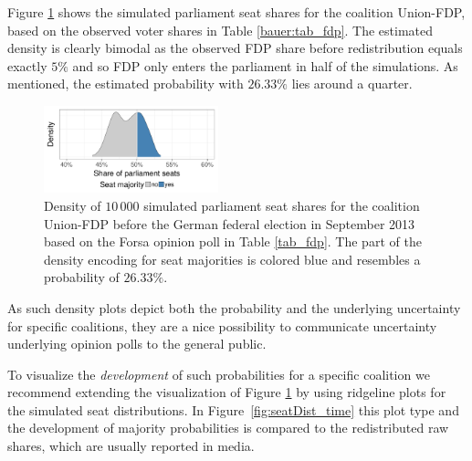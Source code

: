 \documentclass[smallcondensed]{svjour3}     %
\begin{document}
Figure \ref{fig:seatDist} shows the simulated
parliament seat shares for the coalition Union-FDP, based on the observed
voter shares in Table \ref{bauer:tab_fdp}. The estimated density is clearly bimodal
as the observed FDP share before redistribution equals exactly $5\%$ and
so FDP only enters the parliament in half of the simulations. As mentioned,
the estimated probability with $26.33\%$ lies around a quarter.

\begin{figure}[H]\centering
\includegraphics[width=0.45\textwidth]{figures/2013_forsa_cdufdp_lastPreelectionPoll.pdf}
\caption{Density of $10\,000$ simulated parliament seat shares for the coalition Union-FDP before the German federal election in September 2013 based on the Forsa opinion poll in Table \ref{tab_fdp}. The part of the density encoding for seat majorities is colored blue and resembles a probability of $26.33\%$.
\label{fig:seatDist}
}
\end{figure}

As such density plots depict both the probability and the underlying
uncertainty for specific coalitions, they are a nice possibility to communicate
uncertainty underlying opinion polls to the general public.

To visualize the {\it development} of such probabilities
for a specific coalition we recommend extending the visualization of Figure \ref{fig:seatDist} by using ridgeline plots \citep{wilke_2017} for the simulated seat distributions. In Figure~\ref{fig:seatDist_time} this plot type and the development of majority probabilities is compared to
the redistributed raw shares, which are usually reported in media.
\end{document}
